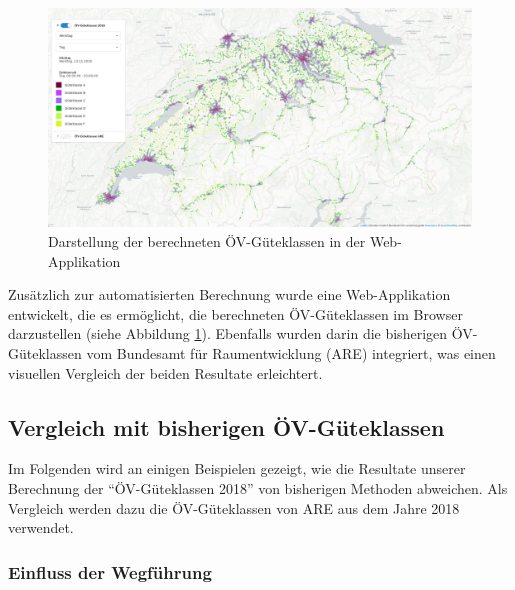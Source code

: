 \begin{figure}[ht]
    \centering
    \includegraphics[width=1\linewidth]{technicalreport/img/resultat_oevgk18_uebersicht}
    \caption[Darstellung der berechneten ÖV-Güteklassen in der Web-Applikation]{Darstellung der berechneten ÖV-Güteklassen in der Web-Applikation}
    \label{fig:resultat_webapp_uebersicht}
\end{figure}

Zusätzlich zur automatisierten Berechnung wurde eine Web-Applikation entwickelt, die es ermöglicht, die berechneten \acs{ÖV}-Güteklassen im Browser darzustellen (siehe Abbildung \ref{fig:resultat_webapp_uebersicht}).
Ebenfalls wurden darin die bisherigen \acs{ÖV}-Güteklassen vom Bundesamt für Raumentwicklung (\acs{ARE}) integriert, was einen visuellen Vergleich der beiden Resultate erleichtert.

\subsection{Vergleich mit bisherigen ÖV-Güteklassen}
\label{Resultate:Vergleich mit bisherigen ÖV-Güteklassen}

Im Folgenden wird an einigen Beispielen gezeigt, wie die Resultate unserer Berechnung der "`\acs{ÖV}-Güteklassen 2018"' von bisherigen Methoden abweichen.
Als Vergleich werden dazu die \acs{ÖV}-Güteklassen von \ac{ARE} aus dem Jahre 2018~\cite{berechnung_are} verwendet.

\subsubsection{Einfluss der Wegführung}


